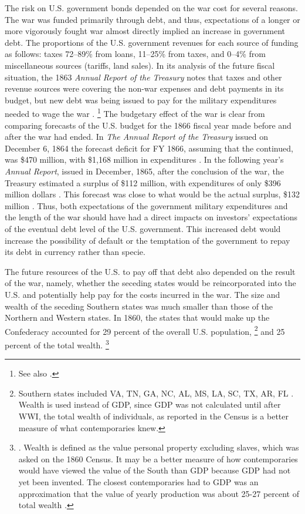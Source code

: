 The risk on U.S. government bonds depended on the war cost for several reasons.
The  war was funded primarily through debt, and thus, expectations of a longer or more vigorously fought war almost directly implied an increase in government debt.
The proportions of the U.S. government revenues for each source of funding as follows: taxes 72--89\% from loans, 11--25\% from taxes, and 0--4\% from miscellaneous sources (tariffs, land sales).
In its analysis of the future fiscal situation, the 1863 \textit{Annual Report of the Treasury} notes that taxes and other revenue sources were covering the non-war expenses and debt payments in its budget, but new debt was being issued to pay for the military expenditures needed to wage the war \parencite[10-13]{Treasury1863}.
\footnote{See also \textcite[][14]{Godfrey1976}.}
The budgetary effect of the war is clear from  comparing forecasts of the U.S. budget for the 1866 fiscal year made before and after the war had ended.
In \textit{The Annual Report of the  Treasury} issued on December 6, 1864 the forecast deficit for FY 1866, assuming that the continued, was \$470 million, with \$1,168 million in expenditures \parencite[13]{Treasury1864}.
In the following year's \textit{Annual Report}, issued in December, 1865, after the conclusion of the war, the Treasury estimated a surplus of \$112 million, with expenditures of only \$396 million dollars \parencite{Treasury1865}.
This forecast was close to what would be the actual surplus, \$132 million \parencite[2]{Treasury1866}.
Thus, both expectations of the government military expenditures and the length of the war should have had a direct impacts on investors' expectations of the eventual debt level of the U.S. government.
This increased debt would increase the possibility of default or the temptation of the government to repay its debt in currency rather than specie.

The future resources of the U.S. to pay off that debt also depended on the result of the war, namely, whether the seceding states would be reincorporated into the U.S. and potentially help pay for the costs incurred in the war.
The size and wealth of the seceding Southern states was much smaller than those of the Northern and Western states.
In 1860, the states that would make up the Confederacy accounted for 29 percent of the overall U.S. population,%
\footnote{
  Southern states included VA, TN, GA, NC, AL, MS, LA, SC, TX, AR, FL \textcite[5]{Eicher2001}.
  Wealth is used instead of GDP, since GDP was not calculated until after WWI, the total wealth of individuals, as reported in the Census is a better measure of what contemporaries knew.
}
and 25 percent of the total wealth.%
\footnote{
  \textcite[12]{Elder1865}. Wealth is defined as the value personal property excluding slaves, which was asked on the 1860 Census.
  It may be a better measure of how contemporaries would have viewed the value of the South than GDP because GDP had not yet been invented.
  The closest contemporaries had to GDP was an approximation that the value of yearly production was about 25-27 percent of total wealth \parencites[7]{Elder1865}[24]{Treasury1865}.
}

